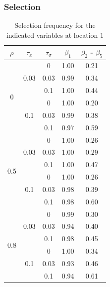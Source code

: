\documentclass[authoryear, review, 11pt]{elsarticle}
\begin{document}
		\subsubsection{Selection}
		\begin{table}[ht]
		\begin{center}
		\begin{tabular}{ccc|cc}
		$\rho$ & $\tau_x$ & $\tau_\sigma$ &  $\beta_1$ & $\beta_2$ - $\beta_5$ \\ 
		  \hline
		\multirow{6}{*}{0} & \multirow{3}{*}{0.03} & 0 & 1.00 & 0.21 \\ 
		 &  & 0.03 &   0.99 & 0.34 \\ 
		 &  & 0.1 &   1.00 & 0.44 \\ \cline{2-5}
		 & \multirow{3}{*}{0.1} & 0 &   1.00 & 0.20 \\ 
		 &  & 0.03 &   0.99 & 0.38 \\ 
		 &  & 0.1 &   0.97 & 0.59 \\ \cline{1-5}
		\multirow{6}{*}{0.5} & \multirow{3}{*}{0.03} & 0 &   1.00 & 0.26 \\ 
		 &  & 0.03 &   1.00 & 0.29 \\ 
		 &  & 0.1 &   1.00 & 0.47 \\ \cline{2-5}
		 & \multirow{3}{*}{0.1} & 0 &   1.00 & 0.26 \\ 
		 &  & 0.03 &   0.98 & 0.39 \\ 
		 &  & 0.1 &   0.98 & 0.60 \\ \cline{1-5}
		\multirow{6}{*}{0.8} & \multirow{3}{*}{0.03} & 0 &   0.99 & 0.30 \\ 
		 &  & 0.03 &   0.94 & 0.40 \\ 
		 &  & 0.1 &   0.98 & 0.45 \\ \cline{2-5}
		 & \multirow{3}{*}{0.1} & 0 &   1.00 & 0.34 \\ 
		 &  & 0.03 &   0.93 & 0.46 \\ 
		 &  & 0.1 &   0.94 & 0.61 \\ 
		  \end{tabular}
		\caption{Selection frequency for the indicated variables at location 1\label{table:loc1-selection}}
		\end{center}
		\end{table}
\end{document}
